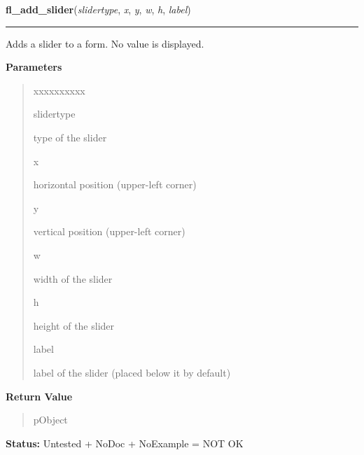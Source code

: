 \hspace{.8\funcindent}\begin{boxedminipage}{\funcwidth}

    \raggedright \textbf{fl\_add\_slider}(\textit{slidertype}, \textit{x}, \textit{y}, \textit{w}, \textit{h}, \textit{label})

    \vspace{-1.5ex}

    \rule{\textwidth}{0.5\fboxrule}
\setlength{\parskip}{2ex}
    Adds a slider to a form. No value is displayed.

\setlength{\parskip}{1ex}
      \textbf{Parameters}
      \vspace{-1ex}

      \begin{quote}
        \begin{Ventry}{xxxxxxxxxx}

          \item[slidertype]

          type of the slider

          \item[x]

          horizontal position (upper-left corner)

          \item[y]

          vertical position (upper-left corner)

          \item[w]

          width of the slider

          \item[h]

          height of the slider

          \item[label]

          label of the slider (placed below it by default)

        \end{Ventry}

      \end{quote}

      \textbf{Return Value}
    \vspace{-1ex}

      \begin{quote}
      pObject

      \end{quote}

\textbf{Status:} Untested + NoDoc + NoExample = NOT OK



    \end{boxedminipage}

